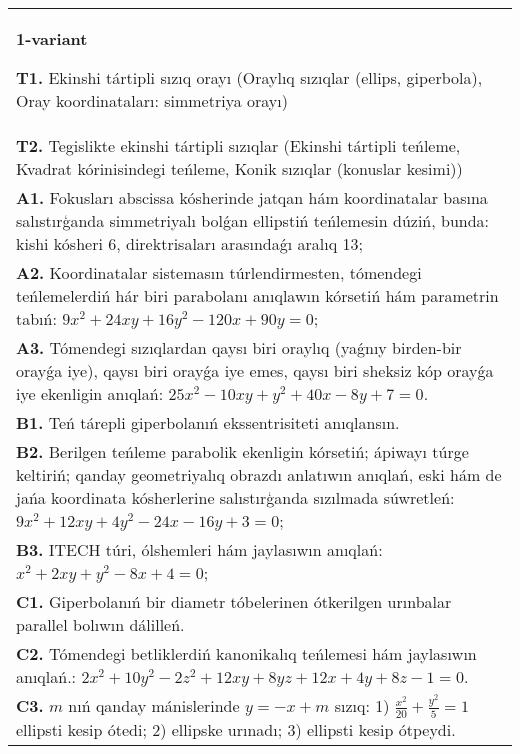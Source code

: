 \documentclass{article}
\begin{document}


\begin{tabular}{m{17cm}}
\textbf{1-variant}
\newline

\textbf{T1.} Ekinshi tártipli sızıq orayı (Oraylıq sızıqlar (ellips, giperbola), Oray koordinataları: simmetriya orayı) \\
\textbf{T2.} Tegislikte ekinshi tártipli sızıqlar (Ekinshi tártipli teńleme, Kvadrat kórinisindegi teńleme, Konik sızıqlar (konuslar kesimi)) \\
\textbf{A1.} Fokusları abscissa kósherinde jatqan hám koordinatalar basına salıstırģanda simmetriyalı bolǵan ellipstiń teńlemesin dúziń, bunda: kishi kósheri 6, direktrisaları arasındaǵı aralıq 13; \\
\textbf{A2.} Koordinatalar sistemasın túrlendirmesten, tómendegi teńlemelerdiń hár biri parabolanı anıqlawın kórsetiń hám parametrin tabıń: $9 x^2+24 x y+16 y^2-120 x+90 y=0$; \\
\textbf{A3.} Tómendegi sızıqlardan qaysı biri oraylıq (yaǵnıy birden-bir orayǵa iye), qaysı biri orayǵa iye emes, qaysı biri sheksiz kóp orayǵa iye ekenligin anıqlań: $25 x^2-10 x y+y^2+40 x-8 y+7=0$. \\
\textbf{B1.} Teń tárepli giperbolanıń ekssentrisiteti anıqlansın. \\
\textbf{B2.} Berilgen teńleme parabolik ekenligin kórsetiń; ápiwayı túrge keltiriń; qanday geometriyalıq obrazdı anlatıwın anıqlań, eski hám de jańa koordinata kósherlerine salıstırģanda sızılmada súwretleń:$9 x^2+12 x y+4 y^2-24 x-16 y+3=0$; \\
\textbf{B3.} ITECH túri, ólshemleri hám jaylasıwın anıqlań: $x^2+2 x y+y^2-8 x+4=0$; \\
\textbf{C1.} Giperbolanıń bir diametr tóbelerinen ótkerilgen urınbalar parallel bolıwın dálilleń. \\
\textbf{C2.} Tómendegi betliklerdiń kanonikalıq teńlemesi hám jaylasıwın anıqlań.: $2 x^2+10 y^2-2 z^2+12 x y+8 y z+12 x+4 y+8 z-1=0$. \\
\textbf{C3.} $m$ nıń qanday mánislerinde $y=-x+m$ sızıq: 1) $\frac{x^2}{20}+\frac{y^2}{5}=1$ ellipsti kesip ótedi; 2) ellipske urınadı; 3) ellipsti kesip ótpeydi. \\

\end{tabular}
\vspace{1cm}
\end{document}
